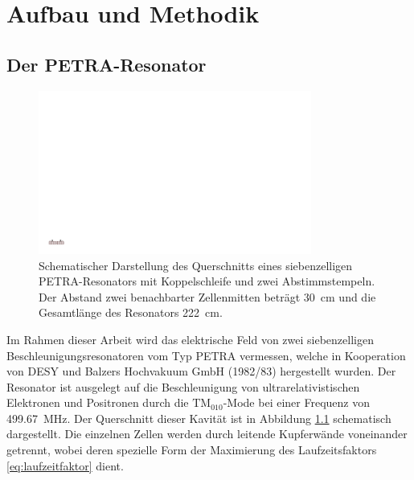 \chapter{Aufbau und Methodik}
\label{sec:aufbau_und_methodik}


\section{Der PETRA-Resonator}
\begin{figure}[htb]
  \centering
  \includegraphics[width=0.8\textwidth]{./figs/cavity/cavity.pdf}
  \caption[Schematische Darstellung des Querschnitts eines siebenzelligen PETRA-Resonators mit Koppelschleife und zwei Abstimmstempeln]{Schematischer Darstellung des Querschnitts eines siebenzelligen PETRA-Resonators mit Koppelschleife und zwei Abstimmstempeln. Der Abstand zwei benachbarter Zellenmitten beträgt \SI{30}{\centi\metre} und die Gesamtlänge des Resonators \SI{222}{\centi\metre}.}
  \label{fig:petra_cavity}
\end{figure}
Im Rahmen dieser Arbeit wird das elektrische Feld von zwei siebenzelligen Beschleunigungsresonatoren vom Typ PETRA \cite{desy_petra} vermessen, welche in Kooperation von DESY und Balzers Hochvakuum GmbH (1982/83) hergestellt wurden.
Der Resonator ist ausgelegt auf die Beschleunigung von ultrarelativistischen Elektronen und Positronen durch die $\mathrm{TM}_{010}$-Mode bei einer Frequenz von \SI{499.67}{MHz}.
Der Querschnitt dieser Kavität ist in Abbildung \ref{fig:petra_cavity} schematisch dargestellt.
Die einzelnen Zellen werden durch leitende Kupferwände voneinander getrennt, wobei deren spezielle Form der Maximierung des Laufzeitsfaktors \eqref{eq:laufzeitfaktor} dient.
